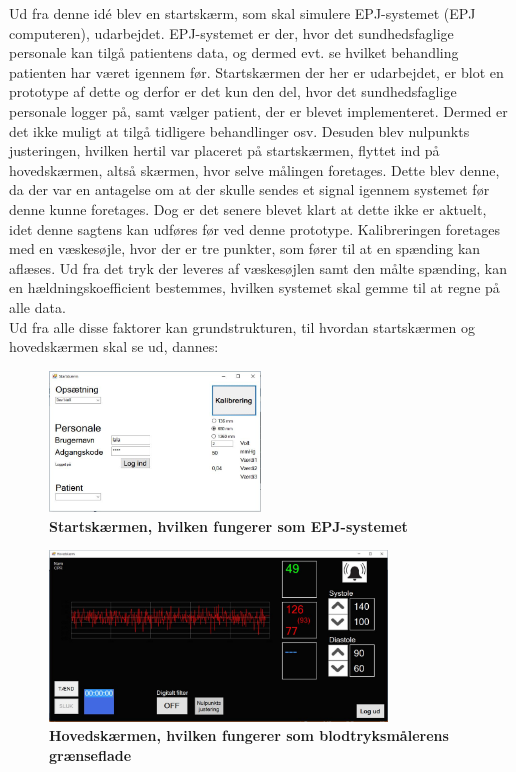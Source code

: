 Ud fra denne idé blev en startskærm, som skal simulere EPJ-systemet (EPJ computeren), udarbejdet. EPJ-systemet er der, hvor det sundhedsfaglige personale kan tilgå patientens data, og dermed evt. se hvilket behandling patienten har været igennem før. Startskærmen der her er udarbejdet, er blot en prototype af dette og derfor er det kun den del, hvor det sundhedsfaglige personale logger på, samt vælger patient, der er blevet implementeret. Dermed er det ikke muligt at tilgå tidligere behandlinger osv. Desuden blev nulpunkts justeringen, hvilken hertil var placeret på startskærmen, flyttet ind på hovedskærmen, altså skærmen, hvor selve målingen foretages. Dette blev denne, da der var en antagelse om at der skulle sendes et signal igennem systemet før denne kunne foretages. Dog er det senere blevet klart at dette ikke er aktuelt, idet denne sagtens kan udføres før ved denne prototype. Kalibreringen foretages med en væskesøjle, hvor der er tre punkter, som fører til at en spænding kan aflæses. Ud fra det tryk der leveres af væskesøjlen samt den målte spænding, kan en hældningskoefficient bestemmes, hvilken systemet skal gemme til at regne på alle data.\\
Ud fra alle disse faktorer kan grundstrukturen, til hvordan startskærmen og hovedskærmen skal se ud, dannes:
\begin{figure}[H]
\includegraphics[width =0.5\textwidth , center]{billeder/SkitseStartNy}
\caption{\textbf{Startskærmen, hvilken fungerer som EPJ-systemet}}
\end{figure}
\begin{figure}[H]
\includegraphics[width =0.8\textwidth , center]{billeder/SkitseHovedNy}
\caption{\textbf{Hovedskærmen, hvilken fungerer som blodtryksmålerens grænseflade}}
\end{figure}
